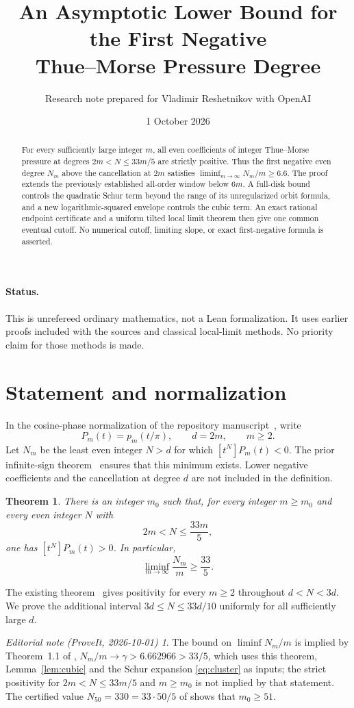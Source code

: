 \documentclass[11pt,a4paper]{article}
\title{An Asymptotic Lower Bound for the First Negative\\Thue--Morse Pressure Degree}
\author{Research note prepared for Vladimir Reshetnikov with OpenAI}
\date{1 October 2026}
\newtheorem{theorem}{Theorem}[section]\newtheorem{lemma}[theorem]{Lemma}
\theoremstyle{remark}\newtheorem*{ednote}{Editorial note (ProveIt, 2026-10-01)}
\begin{document}
\maketitle
\begin{abstract}
For every sufficiently large integer $m$, all even coefficients of integer Thue--Morse pressure at degrees $2m<N\le 33m/5$ are strictly positive. Thus the first negative even degree $N_m$ above the cancellation at $2m$ satisfies $\liminf_{m\to\infty}N_m/m\ge 6.6$. The proof extends the previously established all-order window below $6m$. A full-disk bound controls the quadratic Schur term beyond the range of its unregularized orbit formula, and a new logarithmic-squared envelope controls the cubic term. An exact rational endpoint certificate and a uniform tilted local limit theorem then give one common eventual cutoff. No numerical cutoff, limiting slope, or exact first-negative formula is asserted.
\end{abstract}
\paragraph{Status.} This is unrefereed ordinary mathematics, not a Lean formalization. It uses earlier proofs included with the sources and classical local-limit methods. No priority claim for those methods is made.

\section{Statement and normalization}
In the cosine-phase normalization of the repository manuscript~\cite{Repo}, write
\[
 P_m(t)=p_m(t/\pi),\qquad d=2m,\qquad m\ge2.
\]
Let $N_m$ be the least even integer $N>d$ for which $[t^N]P_m(t)<0$. The prior infinite-sign theorem~\cite{Signs} ensures that this minimum exists. Lower negative coefficients and the cancellation at degree $d$ are not included in the definition.
\begin{theorem}\label{thm:main}
There is an integer $m_0$ such that, for every integer $m\ge m_0$ and every even integer $N$ with
\[
 2m<N\le\frac{33m}{5},
\]
one has $[t^N]P_m(t)>0$. In particular,
\[
 \liminf_{m\to\infty}\frac{N_m}{m}\ge\frac{33}{5}.
\]
\end{theorem}
The existing theorem~\cite{AllOrders} gives positivity for every $m\ge2$ throughout $d<N<3d$. We prove the additional interval $3d\le N\le33d/10$ uniformly for all sufficiently large $d$.
\begin{ednote}
The bound on $\liminf N_m/m$ is implied by Theorem~1.1 of ,
$N_m/m\to\gamma>6.662966>33/5$, which uses this theorem, Lemma~\ref{lem:cubic} and the Schur
expansion \eqref{eq:cluster} as inputs; the strict positivity for $2m<N\le33m/5$ and $m\ge m_0$
is not implied by that statement. The certified value $N_{50}=330=33\cdot50/5$ of
 shows that $m_0\ge51$.
\end{ednote}
\end{document}
